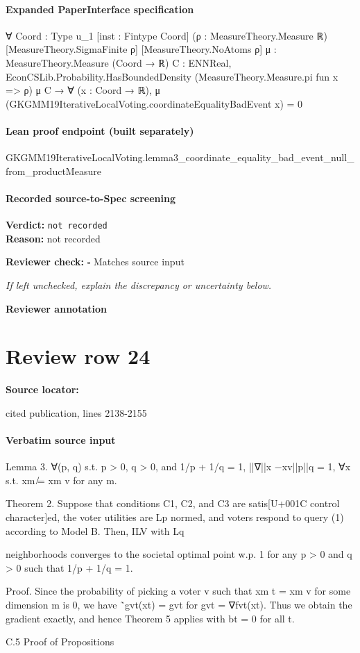 \documentclass[10pt]{article}
\newcommand{\reviewerbox}{%
  \par\noindent\fbox{\parbox{0.96\linewidth}{\rule{0pt}{0.38in}}}\par
}
\newcommand{\reviewmatch}[1]{%
  \par\noindent\textbf{Reviewer check:} $\square$\; #1\par
  \noindent\emph{If left unchecked, explain the discrepancy or uncertainty below.}\par
}
\begin{document}
\paragraph{Expanded PaperInterface specification}
\begin{ReviewVerbatim}
∀ {Coord : Type u_1} [inst : Fintype Coord] (ρ : MeasureTheory.Measure ℝ) [MeasureTheory.SigmaFinite ρ]
  [MeasureTheory.NoAtoms ρ] {μ : MeasureTheory.Measure (Coord → ℝ)} {C : ENNReal},
  EconCSLib.Probability.HasBoundedDensity (MeasureTheory.Measure.pi fun x => ρ) μ C →
    ∀ (x : Coord → ℝ), μ (GKGMM19IterativeLocalVoting.coordinateEqualityBadEvent x) = 0
\end{ReviewVerbatim}

\paragraph{Lean proof endpoint (built separately)}\begin{ReviewVerbatim}
GKGMM19IterativeLocalVoting.lemma3_coordinate_equality_bad_event_null_from_productMeasure
\end{ReviewVerbatim}

\paragraph{Recorded source-to-Spec screening}
\textbf{Verdict:} \texttt{not recorded}
\\
\textbf{Reason:} not recorded
\reviewmatch{Matches source input}
\noindent\textbf{Reviewer annotation}\par
\reviewerbox
\clearpage
\hypertarget{source-claim-06e42dc4cb47855b}{}
\section*{Review row 24}
\textbf{Source locator:} {\footnotesize\raggedright cited publication, lines 2138-\allowbreak{}2155\par}
\paragraph{Verbatim source input}
\begin{ReviewVerbatim}
Lemma 3. ∀(p, q) s.t. p > 0, q > 0, and 1/p + 1/q = 1, ||∇||x −xv||p||q = 1, ∀x s.t.
xm ̸= xm
v for any m.

Theorem 2. Suppose that conditions C1, C2, and C3 are satis[U+001C control character]ed, the voter utilities are
Lp normed, and voters respond to query (1) according to Model B. Then, ILV with Lq

neighborhoods converges to the societal optimal point w.p. 1 for any p > 0 and q > 0 such
that 1/p + 1/q = 1.

Proof. Since the probability of picking a voter v such that xm
t = xm
v for some dimension m
is 0, we have ˜gvt(xt) = gvt for gvt = ∇fvt(xt). Thus we obtain the gradient exactly, and
hence Theorem 5 applies with bt = 0 for all t.

C.5 Proof of Propositions
\end{ReviewVerbatim}
\end{document}
